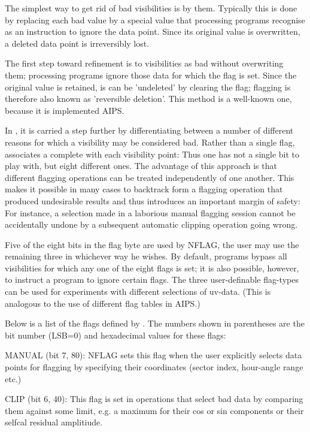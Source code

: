 	The simplest way to get rid of bad visibilities is by 
them. Typically this is done by replacing each bad value by a special value
that processing programs recognise as an instruction to ignore the data point.
Since its original value is overwritten, a deleted data point is irreversibly
lost.

	The first step toward refinement is to  visibilities as bad
without overwriting them; processing programs ignore those data for which the
flag is set. Since the original value is retained, is can be 'undeleted' by
clearing the flag; flagging is therefore also known as 'reversible deletion'.
This method is a well-known one, because it is implemented AIPS.

	In \NEWSTAR, it is carried a step further by differentiating between a
number of different reasons for which a visibility may be considered bad.
Rather than a single flag, \NEWSTAR associates a complete  with
each visibility point: Thus one has not a single bit to play with, but eight
different ones.     The advantage of this approach is that different flagging
operations can be treated independently of one another. This makes it possible
in many cases to backtrack form a flagging operation that produced undesirable
results and thus introduces an important margin of safety: For instance, a
selection made in a laborious manual flagging session cannot be accidentally
undone by a subsequent automatic clipping operation going wrong.

	Five of the eight bits in the flag byte are used by NFLAG, the user may
use the remaining three in whichever way he wishes. By default, programs bypass
all visibilities for which any one of the eight flags is set; it is also
possible, however, to instruct a program to ignore certain flags. The three
user-definable flag-types can be used for experiments with different selections
of uv-data. (This is analogous to the use of different flag tables in AIPS.)

	Below is a list of the flags defined by \NEWSTAR. The numbers shown in
parentheses are the bit number (LSB=0) and hexadecimal values for these flags:
\bi

\item   MANUAL (bit 7, 80): NFLAG sets this flag when the user explicitly
selects data points for flagging by specifying their coordinates (sector index,
hour-angle range etc.)

\item   CLIP (bit 6, 40): This flag is set in operations that select bad data
by comparing them against some limit, e.g. a maximum for their cos or sin
components or their selfcal residual amplitiude.

